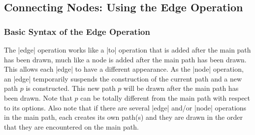 \subsection{Connecting Nodes: Using the Edge Operation}
\label{section-nodes-edges}

\subsubsection{Basic Syntax of the Edge Operation}

The |edge| operation works like a |to| operation that is added after the main
path has been drawn, much like a node is added after the main path has been
drawn. This allows each |edge| to have a different appearance. As the |node|
operation, an |edge| temporarily suspends the construction of the current path
and a new path $p$ is constructed. This new path $p$ will be drawn after the
main path has been drawn. Note that $p$ can be totally different from the main
path with respect to its options. Also note that if there are several |edge|
and/or |node| operations in the main path, each creates its own path(s) and
they are drawn in the order that they are encountered on the main path.

